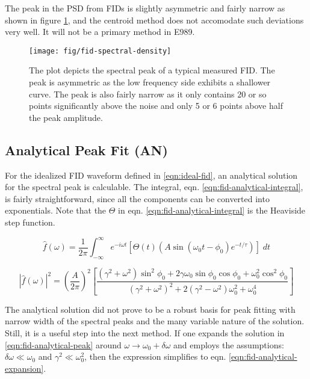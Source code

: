 The peak in the PSD from FIDs is slightly asymmetric and fairly narrow as shown in figure \ref{fig:fid-spectral-density}, and the centroid method does not accomodate such deviations very well.  It will not be a primary method in E989.

\begin{figure}
\centering
\texttt{[image: fig/fid-spectral-density]}
\caption{
    The plot depicts the spectral peak of a typical measured FID.  The peak is asymmetric as the low frequency side exhibits a shallower curve.  The peak is also fairly narrow as it only contains 20 or so points significantly above the noise and only 5 or 6 points above half the peak amplitude.
    \label{fig:fid-spectral-density}
}
\end{figure}

\subsection{Analytical Peak Fit (AN)} \label{s-sec:fid-analytical}
For the idealized FID waveform defined in \ref{eqn:ideal-fid}, an analytical solution for the spectral peak is calculable.  The integral, eqn. \ref{eqn:fid-analytical-integral}, is fairly straightforward, since all the components can be converted into exponentials.  Note that the $\Theta$ in eqn. \ref{eqn:fid-analytical-integral} is the Heaviside step function.

\begin{equation}
\label{eqn:fid-analytical-integral}
\hat{f}(\omega) = \frac{1}{2\pi} \int_{-\infty}^{\infty} 
e^{-i \omega t} \left[ \Theta(t) \left(A \sin(\omega_0 t - \phi_0) e^{-t / \tau} \right) \right] \;dt
\end{equation}

\begin{equation}
\label{eqn:fid-analytical-peak}
\left| \hat{f}(\omega) \right|^2 = 
\left( \frac{A}{2\pi} \right)^2
\left[\frac{(\gamma^2 + \omega^2) \sin^2{\phi_0} 
+ 2 \gamma \omega_0 \sin{\phi_0} \cos{\phi_0} + \omega_0^2 \cos^2{\phi_0}}{(\gamma^2 + \omega^2)^2 + 2(\gamma^2 - \omega^2) \omega_0^2 + \omega_0^4}
\right]
\end{equation}

The analytical solution did not prove to be a robust basis for peak fitting with narrow width of the spectral peaks and the many variable nature of the solution.  Still, it is a useful step into the next method.  If one expands the solution in \ref{eqn:fid-analytical-peak} around $\omega \rightarrow \omega_0 + \delta \omega$ and employs the assumptions: $\delta \omega \ll \omega_0$ and $\gamma^2 \ll \omega_0^2$, then the expression simplifies to eqn. \ref{eqn:fid-analytical-expansion}.

